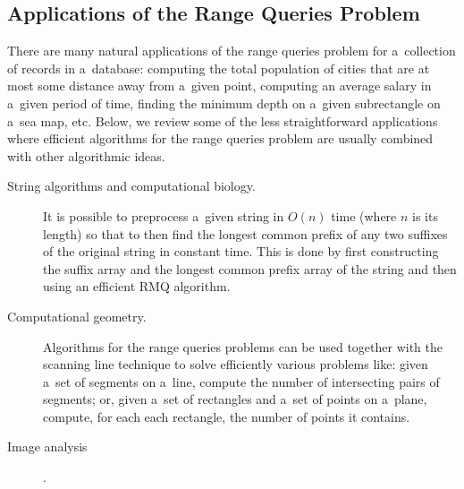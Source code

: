 \subsection{Applications of the Range Queries Problem}\label{subseq:rmqapp}
There are many natural applications of the range queries problem for a~collection of records in a~database: computing the total population of cities that are at most some distance away from a~given point, computing an average salary in a~given period of time, finding the minimum depth on a~given subrectangle on a~sea map, etc. Below, we review some of the less straightforward applications where efficient algorithms for the range queries problem are usually combined with other algorithmic ideas.
\begin{description}
\item[String algorithms and computational biology.]
It is possible to preprocess a~given string in $O(n)$ time (where $n$ is its length) so that to then find the longest common prefix of any two suffixes of the original string in constant time. This is done by first constructing the suffix array and the longest common prefix array of the string and then using an efficient RMQ algorithm.

\item[Computational geometry.] Algorithms for the range queries problems can be used together with the scanning line technique to solve efficiently various problems like: given a~set of segments on a~line, compute the number of intersecting pairs of segments; or, given a~set of rectangles and a~set of points on a~plane, compute, for each each rectangle, the number of points it contains. 

\item[Image analysis]. 

\end{description}

